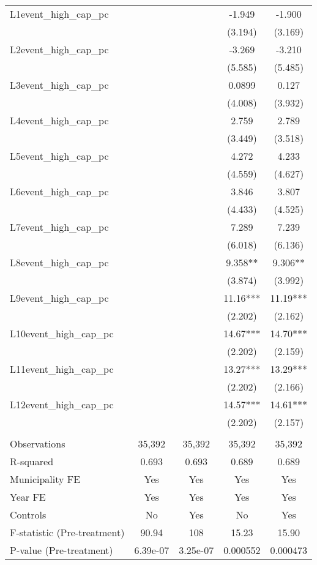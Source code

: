 \documentclass[]{article}
\begin{document}
\begin{tabular}{lcccc}
L1event\_high\_cap\_pc &  &  & -1.949 & -1.900 \\
 &  &  & (3.194) & (3.169) \\
L2event\_high\_cap\_pc &  &  & -3.269 & -3.210 \\
 &  &  & (5.585) & (5.485) \\
L3event\_high\_cap\_pc &  &  & 0.0899 & 0.127 \\
 &  &  & (4.008) & (3.932) \\
L4event\_high\_cap\_pc &  &  & 2.759 & 2.789 \\
 &  &  & (3.449) & (3.518) \\
L5event\_high\_cap\_pc &  &  & 4.272 & 4.233 \\
 &  &  & (4.559) & (4.627) \\
L6event\_high\_cap\_pc &  &  & 3.846 & 3.807 \\
 &  &  & (4.433) & (4.525) \\
L7event\_high\_cap\_pc &  &  & 7.289 & 7.239 \\
 &  &  & (6.018) & (6.136) \\
L8event\_high\_cap\_pc &  &  & 9.358** & 9.306** \\
 &  &  & (3.874) & (3.992) \\
L9event\_high\_cap\_pc &  &  & 11.16*** & 11.19*** \\
 &  &  & (2.202) & (2.162) \\
L10event\_high\_cap\_pc &  &  & 14.67*** & 14.70*** \\
 &  &  & (2.202) & (2.159) \\
L11event\_high\_cap\_pc &  &  & 13.27*** & 13.29*** \\
 &  &  & (2.202) & (2.166) \\
L12event\_high\_cap\_pc &  &  & 14.57*** & 14.61*** \\
 &  &  & (2.202) & (2.157) \\
 &  &  &  &  \\
Observations & 35,392 & 35,392 & 35,392 & 35,392 \\
R-squared & 0.693 & 0.693 & 0.689 & 0.689 \\
Municipality FE & Yes & Yes & Yes & Yes \\
Year FE & Yes & Yes & Yes & Yes \\
Controls & No & Yes & No & Yes \\
F-statistic (Pre-treatment) & 90.94 & 108 & 15.23 & 15.90 \\
P-value (Pre-treatment) & 6.39e-07 & 3.25e-07 & 0.000552 & 0.000473 \\

\end{tabular}
\end{document}
